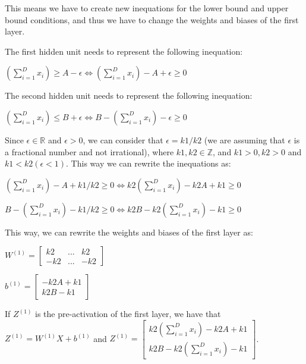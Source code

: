 \documentclass{article}
\begin{document}
This means we have to create new inequations for the lower bound and upper bound conditions, 
and thus we have to change the weights and biases of the first layer.

The first hidden unit needs to represent the following inequation:

\bigskip

$(\sum_{i=1}^{D} x_i) \geq A - \epsilon \iff (\sum_{i=1}^{D} x_i) - A + \epsilon \geq 0$

\bigskip

The second hidden unit needs to represent the following inequation:

\bigskip

$(\sum_{i=1}^{D} x_i) \leq B + \epsilon \iff B - (\sum_{i=1}^{D} x_i) - \epsilon \geq 0$

\bigskip

Since $\epsilon \in \mathbb{R}$ and $\epsilon > 0$, we can consider that $\epsilon = k1/k2$ (we are assuming that $\epsilon$
is a fractional number and not irrational), where $k1, k2 \in \mathbb{Z}$, 
and $k1 > 0, k2 > 0$ and $k1 < k2 (\epsilon < 1)$. This way we can rewrite the inequations as:

\bigskip

$(\sum_{i=1}^{D} x_i) - A + k1/k2 \geq 0 \iff k2(\sum_{i=1}^{D} x_i) - k2A + k1 \geq 0$

\bigskip

$B - (\sum_{i=1}^{D} x_i) - k1/k2 \geq 0 \iff k2B - k2(\sum_{i=1}^{D} x_i) - k1 \geq 0$

\bigskip

This way, we can rewrite the weights and biases of the first layer as:

\bigskip

\( W^{(1)} = \begin{bmatrix}
    k2  & ... & k2  \\
    -k2 & ... & -k2
\end{bmatrix}
\)

\medskip

\(b^{(1)} = \begin{bmatrix}
    -k2A + k1 \\
    k2B - k1
\end{bmatrix}
\)

\bigskip

If $Z^{(1)}$ is the pre-activation of the first layer, we have that $Z^{(1)} = W^{(1)}X + b^{(1)}$ and
$Z^{(1)} = \begin{bmatrix}
    k2(\sum_{i=1}^{D} x_i) - k2A + k1\\
    k2B - k2(\sum_{i=1}^{D} x_i) - k1
\end{bmatrix}
$.
\end{document}
